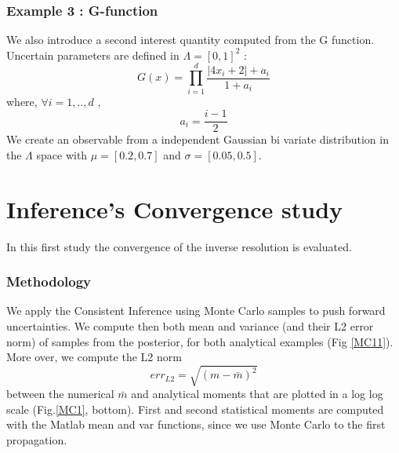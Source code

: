 \documentclass[11pt, a4paper, English]{report}
\begin{document}
\subsubsection{Example 3 : G-function}
We also introduce a second interest quantity computed from the G function. Uncertain parameters are  defined in $\Lambda = [0,1]^2$ : 
$$ G(x) = \prod_{i=1}^d \frac{|4x_i+2|+a_i}{1+a_i} $$
where, $\forall i = 1,..,d$ ,
$$a_i = \frac{i - 1}{2} $$
We create an observable from a independent Gaussian bi variate distribution in the $\Lambda$ space with $\mu = [0.2, 0.7]$ and $\sigma = [0.05, 0.5]$.
\section{Inference's Convergence study}
In this first study the convergence of the inverse resolution is evaluated. 

\subsubsection{Methodology}
We apply the Consistent Inference using Monte Carlo samples to push forward uncertainties. We compute then both mean and variance (and their L2 error norm) of samples from the posterior, for both analytical examples (Fig \ref{MC11}). More over, we compute the L2 norm 
$$err_{L2} = \sqrt{(m-\bar{m})^2} $$ 
between the numerical $\bar{m}$ and analytical moments that are plotted in a log log scale (Fig.\ref{MC1}, bottom). First and second statistical moments are computed with the Matlab mean and var functions, since we use Monte Carlo to the first propagation.
\end{document}
